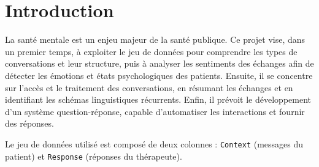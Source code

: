 \documentclass[12pt,a4paper]{article}
\begin{document}
\tableofcontents
\newpage

\section{Introduction}

La santé mentale est un enjeu majeur de la santé publique. Ce projet vise, dans un premier
temps, à exploiter le jeu de données pour comprendre les types de conversations et leur
structure, puis à analyser les sentiments des échanges afin de détecter les émotions et états
psychologiques des patients. Ensuite, il se concentre sur l'accès et le traitement des
conversations, en résumant les échanges et en identifiant les schémas linguistiques récurrents.
Enfin, il prévoit le développement d'un système question-réponse, capable d'automatiser les
interactions et fournir des réponses.

Le jeu de données utilisé est composé de deux colonnes : \texttt{Context} (messages du patient)
et \texttt{Response} (réponses du thérapeute).

\bigbreak
\end{document}

